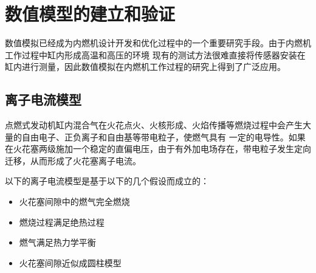 \chapter{数值模型的建立和验证}
数值模拟已经成为内燃机设计开发和优化过程中的一个重要研究手段。由于内燃机工作过程中缸内形成高温和高压的环境
现有的测试方法很难直接将传感器安装在缸内进行测量，因此数值模拟在内燃机工作过程的研究上得到了广泛应用。
\section{离子电流模型}
点燃式发动机缸内混合气在火花点火、火核形成、火焰传播等燃烧过程中会产生大量的自由电子、正负离子和自由基等带电粒子，使燃气具有
一定的电导性。如果在火花塞两级施加一个稳定的直偏电压，由于有外加电场存在，带电粒子发生定向迁移，从而形成了火花塞离子电流。\par
以下的离子电流模型是基于以下的几个假设而成立的：
\begin{itemize}
\item 火花塞间隙中的燃气完全燃烧
\item 燃烧过程满足绝热过程
\item 燃气满足热力学平衡
\item 火花塞间隙近似成圆柱模型
\end{itemize}
